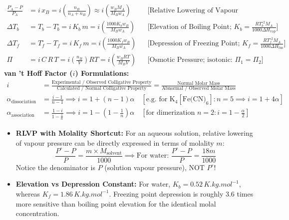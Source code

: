 \documentclass[11pt,a4paper]{article}
\begin{document}
\begin{formulabox}
\begin{align}
  \frac{P_A^\circ - P}{P_A^\circ} &= i\,x_B = i\left(\frac{n_B}{n_A + n_B}\right) \approx i\left(\frac{w_B M_A}{M_B w_A}\right) && \text{[Relative Lowering of Vapour Pressure (RLVP)]} \\
  \Delta T_b &= T_b - T_b^\circ = i\,K_b\,m = i\left(\frac{1000 K_b w_B}{M_B w_A}\right) && \text{[Elevation of Boiling Point; } K_b = \frac{R T_b^{\circ 2} M_A}{1000 \Delta H_{\text{vap}}}\text{]} \\
  \Delta T_f &= T_f^\circ - T_f = i\,K_f\,m = i\left(\frac{1000 K_f w_B}{M_B w_A}\right) && \text{[Depression of Freezing Point; } K_f = \frac{R T_f^{\circ 2} M_A}{1000 \Delta H_{\text{fus}}}\text{]} \\
  \Pi &= i\,C\,R\,T = i\left(\frac{n_B}{V}\right)R T = i\left(\frac{w_B R T}{M_B V}\right) && \text{[Osmotic Pressure; isotonic: } \Pi_1 = \Pi_2\text{]}
\end{align}
\textbf{van 't Hoff Factor ($i$) Formulations:}
\begin{align}
  i &= \frac{\text{Experimental / Observed Colligative Property}}{\text{Calculated / Normal Colligative Property}} = \frac{\text{Normal Molar Mass}}{\text{Abnormal / Observed Molar Mass}} \\
  \alpha_{\text{dissociation}} &= \frac{i - 1}{n - 1} \implies i = 1 + (n - 1)\alpha \quad [\text{e.g. for } \text{K}_4[\text{Fe(CN)}_6]: n = 5 \implies i = 1 + 4\alpha] \\
  \alpha_{\text{association}} &= \frac{1 - i}{1 - \frac{1}{n}} \implies i = 1 - \left(1 - \frac{1}{n}\right)\alpha \quad [\text{for dimerization } n = 2: i = 1 - \frac{\alpha}{2}]
\end{align}
\end{formulabox}

\begin{trapbox}
\begin{itemize}
  \item \textbf{RLVP with Molality Shortcut:} For an aqueous solution, relative lowering of vapour pressure can be directly expressed in terms of molality $m$:
  \begin{equation*}
    \frac{P^\circ - P}{P} = \frac{m \times M_{\text{solvent}}}{1000} \implies \text{For water: } \frac{P^\circ - P}{P} = \frac{18 m}{1000}
  \end{equation*}
  Notice the denominator is $P$ (solution vapour pressure), NOT $P^\circ$!
  \item \textbf{Elevation vs Depression Constant:} For water, $K_b = 0.52\,\si{K.kg.mol^{-1}}$, whereas $K_f = 1.86\,\si{K.kg.mol^{-1}}$. Freezing point depression is roughly 3.6 times more sensitive than boiling point elevation for the identical molal concentration.
\end{itemize}
\end{trapbox}
\end{document}
